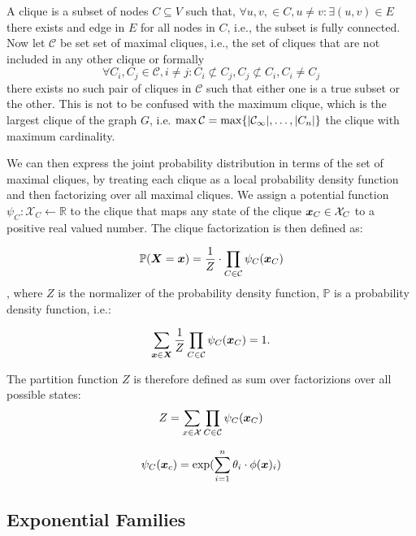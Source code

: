 A clique is a subset of nodes $C \subseteq V$ such that, $\forall u,v,  \in C, u \neq v: \exists (u,v) \in E$ there exists and edge in $E$ for all nodes in $C$, i.e., the subset is fully connected.
Now let $\mathcal{C}$ be set set of maximal cliques, i.e., the set of cliques that are not included in any other clique or formally 
\begin{equation}
    \forall C_i, C_j \in \mathcal{C}, i \neq j  : C_i \not\subset C_j, C_j \not\subset C_i, C_i \neq C_j
\end{equation}
there exists no such pair of cliques in $\mathcal{C}$ such that either one is a true subset or the other.
This is not to be confused with the maximum clique, which is the largest clique of the graph $G$, i.e. $\max \mathcal{C} = \max \{\lvert\mathcal{C_1}\rvert, \ldots, \lvert C_n\rvert\}$ the clique with maximum cardinality.

We can then express the joint probability distribution in terms of the set of maximal cliques, by treating each clique as a local probability density function and then factorizing over all maximal cliques. 
We assign a potential function $\psi_C: \mathcal{X}_C \leftarrow \mathbb{R}$ to the clique that maps any state of the clique $\boldsymbol{x}_C \in \mathcal{X}_C$ to a positive real valued number.
The clique factorization is then defined as:

\begin{equation}
    \mathbb{P}(\boldsymbol{X}=\boldsymbol{x}) = \frac{1}{Z} \cdot \prod_{C \in \mathcal{C}} \psi_C(\boldsymbol{x}_C)
\end{equation},
where $Z$ is the normalizer of the probability density function, $\mathbb{P}$ is a probability density function, i.e.:

\begin{equation}
    \sum_{\boldsymbol{x}\in \mathcal{\boldsymbol{X}}}   \frac{1}{Z} \prod_{C \in \mathcal{C}} \psi_C(\boldsymbol{x}_C)  = 1.
\end{equation}

The partition function $Z$ is therefore defined as sum over factorizions over all possible states:
\begin{equation}
    Z = \sum_{x\in \mathcal{X}} \prod_{C \in \mathcal{C}} \psi_C(\boldsymbol{x}_C)
\end{equation}

\begin{equation}
    \psi_C(\boldsymbol{x}_c) = \exp(\sum_{i=1}^n \theta_i \cdot \phi(\boldsymbol{x})_i)
\end{equation}


\subsection{Exponential Families}
\label{ssec:expf}

